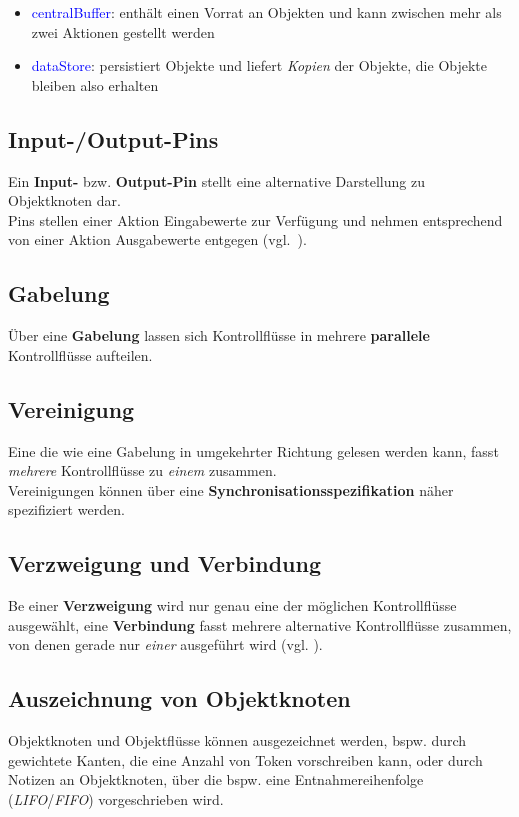 \begin{itemize}
    \item \textcolor{blue}{\guillemotleft centralBuffer\guillemotright}: enthält einen Vorrat an Objekten und kann zwischen mehr als zwei Aktionen gestellt werden
    \item \textcolor{blue}{\guillemotleft dataStore\guillemotright}: persistiert Objekte und liefert \textit{Kopien} der Objekte, die Objekte bleiben also erhalten
\end{itemize}

\subsection{Input-/Output-Pins}
Ein \textbf{Input-} bzw. \textbf{Output-Pin} stellt eine alternative Darstellung zu Objektknoten dar.\\
Pins stellen einer Aktion Eingabewerte zur Verfügung und nehmen entsprechend von einer Aktion Ausgabewerte entgegen (vgl.~\cite[73 f.]{Bal05}).

\subsection{Gabelung}
Über eine \textbf{Gabelung} lassen sich Kontrollflüsse in mehrere \textbf{parallele} Kontrollflüsse aufteilen.

\subsection{Vereinigung}
Eine  die wie eine Gabelung in umgekehrter Richtung gelesen werden kann, fasst \textit{mehrere} Kontrollflüsse zu \textit{einem} zusammen.\\
Vereinigungen können über eine \textbf{Synchronisationsspezifikation} näher spezifiziert werden.

\subsection{Verzweigung und Verbindung}
Be einer \textbf{Verzweigung} wird nur genau eine der möglichen Kontrollflüsse ausgewählt, eine \textbf{Verbindung} fasst mehrere alternative  Kontrollflüsse zusammen, von denen gerade nur \textit{einer} ausgeführt wird (vgl. \cite[60]{Buh09}).

\subsection{Auszeichnung von Objektknoten}
Objektknoten und Objektflüsse können ausgezeichnet werden, bspw. durch gewichtete Kanten, die eine Anzahl von Token vorschreiben kann, oder durch Notizen an Objektknoten, über die bspw. eine Entnahmereihenfolge (\textit{LIFO}/\textit{FIFO}) vorgeschrieben wird.

